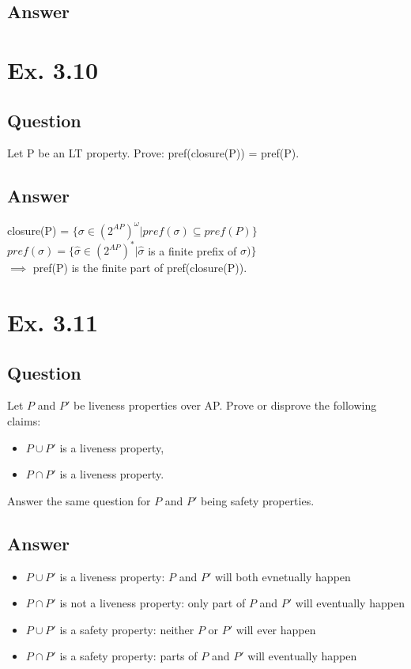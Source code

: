 \documentclass[12pt]{article}
\begin{document}
\subsection*{Answer}


\newpage
\section*{Ex. 3.10}
\subsection*{Question}
Let P be an LT property. Prove: pref(closure(P)) = pref(P).

\subsection*{Answer}
closure(P) = $\{\sigma \in (2^{AP})^\omega|pref(\sigma)\subseteq pref(P)\}$\\
$pref(\sigma) = \{\hat{\sigma}\in (2^{AP})^* | \hat{\sigma}$ is a finite prefix of $\sigma)\}$\\
$\implies$ pref(P) is the finite part of pref(closure(P)).

\section*{Ex. 3.11}
\subsection*{Question}
Let $P$ and $P'$ be liveness properties over AP. Prove or disprove the following
claims:
\begin{itemize}
	\item $P \cup P'$ is a liveness property,
	\item $P \cap P'$ is a liveness property.
\end{itemize}
Answer the same question for $P$ and $P'$ being safety properties.

\subsection*{Answer}
\begin{itemize}
	\item $P \cup P'$ is a liveness property: $P$ and $P'$ will both evnetually happen
	\item $P \cap P'$ is not a liveness property: only part of $P$ and $P'$ will eventually happen
	\item $P \cup P'$ is a safety property: neither $P$ or $P'$ will ever happen
	\item $P \cap P'$ is a safety property: parts of $P$ and $P'$ will eventually happen
\end{itemize}
\end{document}
